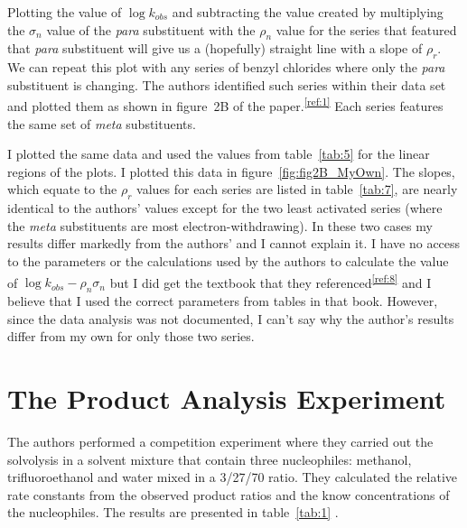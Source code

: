 \documentclass{tufte-handout}
\newcommand{\tss}[1]{\textsuperscript{#1}}
\begin{document}
Plotting the value of $\log{k_{obs}}$ and subtracting the value created by multiplying the $\sigma_n$ value of the \textit{para} substituent with the  $\rho_n$ value for the series that featured that \textit{para} substituent  will give us a (hopefully) straight line with a slope of $\rho_r$. We can repeat this plot with any series of benzyl chlorides where only the \textit{para} substituent is changing.  The authors identified such series within their data set and plotted them as shown in figure~2B of the paper.\tss{\ref{ref:1}} Each series features the same set of \textit{meta} substituents.

I plotted the same data and used the values from table~\ref{tab:5} for the linear regions of the plots. I plotted this data in figure~\vref{fig:fig2B_MyOwn}. The slopes, which equate to the $\rho_r$ values for each series are listed in table~\vref{tab:7}, are nearly identical to the authors' values except for the two least activated series (where the \textit{meta} substituents are most electron-withdrawing). In these two cases my results differ markedly from the authors' and I cannot explain it. I have no access to the parameters or the calculations used by the authors to calculate the value of $\log{k_{obs}}-\rho_n \sigma_n$ but I did get the textbook that they referenced\tss{\ref{ref:8}} and I believe that I used the correct parameters from tables in that book. However, since the data analysis was not documented, I can't say why the author's results differ from my own for only those two series.

\section{The Product Analysis Experiment}

The authors performed a competition experiment where they carried out the solvolysis in a solvent mixture that contain three nucleophiles: methanol, trifluoroethanol and water mixed in a 3/27/70 ratio. They calculated the relative rate constants from the observed product ratios and the know concentrations of the nucleophiles.  The results are presented in table~\ref{tab:1} .
\end{document}
